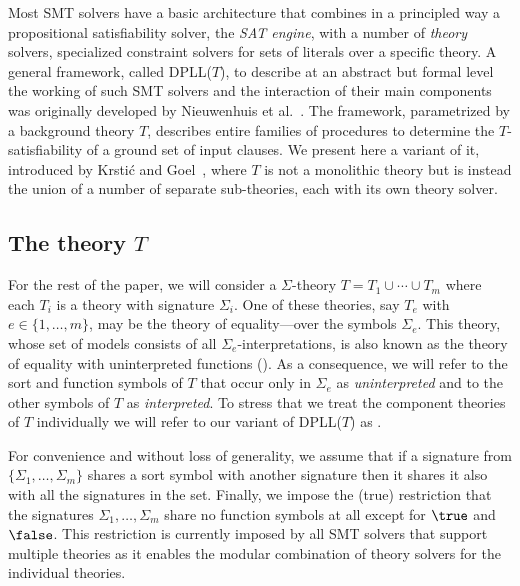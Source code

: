 \documentclass{svjour3}                     %
\begin{document}
Most SMT solvers have a basic architecture that combines in a principled way
a propositional satisfiability solver, the \emph{SAT engine}, 
with a number of \emph{theory} solvers,
specialized constraint solvers for sets of literals over a specific theory. 
A general framework, called DPLL($T$), to describe at an abstract but formal level
the working of such SMT solvers and the interaction of their main components
was originally developed by Nieuwenhuis et al.~\cite{NieOT-JACM-06}.
The framework, parametrized by a background theory $T$, describes entire families
of procedures to determine the $T$-satisfiability of a ground set of input clauses.
We present here a variant of it, introduced by Krsti\'c and Goel~\cite{KrsGoe-FROCOS-07}, 
where $T$ is not a monolithic theory 
but is instead the union of a number of separate sub-theories,
each with its own theory solver.

\subsection{The theory $T$}

For the rest of the paper, we will consider a $\Sigma$-theory $T = T_1 \cup \cdots \cup T_m$
where each $T_i$ is a theory with signature $\Sigma_i$.
One of these theories, say $T_e$ with $e \in \{1,\ldots,m\}$,
may be the theory of equality---over the symbols $\Sigma_e$.
This theory, whose set of models consists of all $\Sigma_e$-interpretations, 
is also known as the theory of equality with uninterpreted functions (\euf).
As a consequence, we will refer to the sort and function symbols of $T$
that occur only in $\Sigma_e$ as \emph{uninterpreted} and 
to the other symbols of $T$ as \emph{interpreted}.
To stress that we treat the component theories of $T$ individually 
we will refer to our variant of DPLL($T$) as \dpllts.

For convenience and without loss of generality, we assume that 
if a signature from $\{\Sigma_1, \ldots, \Sigma_m\}$ shares a
sort symbol with another signature then it shares it also with all the signatures in the set.
Finally, we impose the (true) restriction that
the signatures $\Sigma_1, \ldots, \Sigma_m$ share no function symbols at all
except for $\true$ and $\false$.
This restriction is currently imposed by all SMT solvers that support
multiple theories as it enables the modular combination of theory solvers
for the individual theories.
\end{document}
